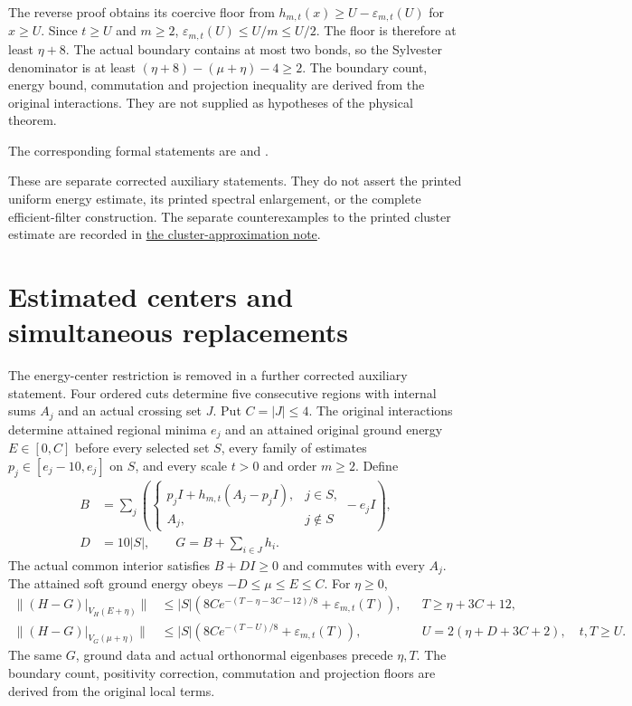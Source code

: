 \documentclass{article}
\begin{document}
The reverse proof obtains its coercive floor from
$h_{m,t}(x)\geq U-\varepsilon_{m,t}(U)$ for $x\geq U$.
Since $t\geq U$ and $m\geq2$,
$\varepsilon_{m,t}(U)\leq U/m\leq U/2$.
The floor is therefore at least $\eta+8$. The actual boundary contains at
most two bonds, so the Sylvester denominator is at least
$(\eta+8)-(\mu+\eta)-4\geq2$.
The boundary count, energy bound, commutation and projection inequality
are derived from the original interactions. They are not supplied as
hypotheses of the physical theorem.

The corresponding formal statements are
and
.

These are separate corrected auxiliary statements. They do not assert the
printed uniform energy estimate, its printed spectral enlargement, or the
complete efficient-filter construction. The separate counterexamples to the printed cluster estimate are recorded in
\href{https://sirui-lu.com/TNLean/paper-gaps/alvv16_cluster_approximation.pdf}{the cluster-approximation note}.

\section{Estimated centers and simultaneous replacements}

The energy-center restriction is removed in a further corrected auxiliary
statement. Four ordered cuts determine five consecutive regions with
internal sums $A_j$ and an actual crossing set $J$. Put $C=|J|\leq4$.
The original interactions determine attained regional minima $e_j$ and
an attained original ground energy $E\in[0,C]$ before every selected set
$S$, every family of estimates $p_j\in[e_j-10,e_j]$ on $S$, and every
scale $t>0$ and order $m\geq2$. Define
\begin{align}
 B&=\sum_j\left(
  \begin{cases}
   p_jI+h_{m,t}(A_j-p_jI),&j\in S,\\
   A_j,&j\notin S
  \end{cases}-e_jI\right),\\
 D&=10|S|,\qquad G=B+\sum_{i\in J}h_i.
\end{align}
The actual common interior satisfies $B+DI\geq0$ and commutes with
every $A_j$. The attained soft ground energy obeys
$-D\leq\mu\leq E\leq C$. For $\eta\geq0$,
\begin{align}
 \|(H-G)|_{V_H(E+\eta)}\|
 &\leq |S|\left(8Ce^{-(T-\eta-3C-12)/8}+\varepsilon_{m,t}(T)\right),
 &&T\geq\eta+3C+12,\\
 \|(H-G)|_{V_G(\mu+\eta)}\|
 &\leq |S|\left(8Ce^{-(T-U)/8}+\varepsilon_{m,t}(T)\right),
 &&U=2(\eta+D+3C+2),\quad t,T\geq U.
\end{align}
The same $G$, ground data and actual orthonormal eigenbases precede
$\eta,T$. The boundary count, positivity correction, commutation and
projection floors are derived from the original local terms.
\end{document}
